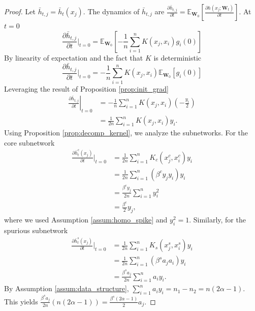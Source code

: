 \documentclass[10pt,a4paper]{amsart}
\begin{document}
\begin{proof}
Let $\bar{h}_{t,j} = \bar{h}_t(x_j)$. The dynamics of $\bar{h}_{t,j}$ are $\frac{\partial \bar{h}_{t,j}}{\partial t} = \mathbb{E}_{\mathbf{W}_0} \left[ \frac{\partial h(x_j; \mathbf{W}_t)}{\partial t} \right]$. At $t=0$
\begin{equation}
   \frac{\partial \bar{h}_{t,j}}{\partial t} \Big|_{t=0} = \mathbb{E}_{\mathbf{W}_0} \left[ -\frac{1}{n} \sum_{i=1}^n K(x_j, x_i) g_i(0) \right] 
\end{equation}
By linearity of expectation and the fact that $K$ is deterministic
\begin{equation}
    \frac{\partial \bar{h}_{t,j}}{\partial t} \Big|_{t=0} = -\frac{1}{n} \sum_{i=1}^n K(x_j, x_i) \mathbb{E}_{\mathbf{W}_0}[g_i(0)]
\end{equation}
Leveraging the result of Proposition \ref{prop:init_grad}
\begin{equation}
\begin{aligned}
\left.\frac{\partial \bar{h}_{t,j}}{\partial t}\right|_{t=0}
&= -\frac{1}{n} \sum_{i=1}^n K(x_j, x_i)\left(-\frac{y_i}{2}\right) \\
&= \frac{1}{2n} \sum_{i=1}^n K(x_j, x_i) y_i.
\end{aligned}
\end{equation}
Using Proposition \ref{prop:decomp_kernel}, we analyze the subnetworks. For the core subnetwork
\begin{equation}
\begin{aligned}
\frac{\partial \bar{h}_t^c(x_j)}{\partial t} \Big|_{t=0}
    &= \frac{1}{2n} \sum_{i=1}^n K_c(x_j^c, x_i^c) y_i \\
    &= \frac{1}{2n} \sum_{i=1}^n (\beta^c y_j y_i) y_i \\
    &= \frac{\beta^c y_j}{2n} \sum_{i=1}^n y_i^2 \\
    &= \frac{\beta^c}{2} y_j,
\end{aligned}
\end{equation}
where we used Assumption \ref{assum:homo_spike} and $y_i^2 = 1$. Similarly, for the spurious subnetwork
\begin{equation}
\begin{aligned}
\frac{\partial \bar{h}_t^s(x_j)}{\partial t} \Big|_{t=0}
    &= \frac{1}{2n} \sum_{i=1}^n K_s(x_j^s, x_i^s) y_i \\
    &= \frac{1}{2n} \sum_{i=1}^n (\beta^s a_j a_i) y_i \\
    &= \frac{\beta^s a_j}{2n} \sum_{i=1}^n a_i y_i .
\end{aligned}
\end{equation}
By Assumption \ref{assum:data_structure}, $\sum_{i=1}^n a_i y_i = n_1 - n_2 = n(2\alpha - 1)$. This yields $\frac{\beta^s a_j}{2n} (n(2\alpha-1)) = \frac{\beta^s (2\alpha - 1)}{2} a_j$.
\end{proof}
\end{document}
